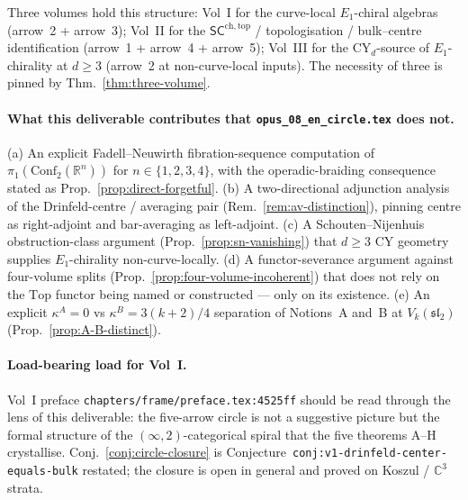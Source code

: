 \documentclass[11pt]{article}
\theoremstyle{definition}
\theoremstyle{remark}
\newcommand{\bC}{\mathbb{C}}
\newcommand{\bR}{\mathbb{R}}
\newcommand{\fsl}{\mathfrak{sl}}
\newcommand{\Conf}{\mathrm{Conf}}
\newcommand{\SCchtop}{\mathsf{SC}^{\mathrm{ch,top}}}
\newcommand{\Eone}{E_1}
\begin{document}
Three volumes hold this structure: Vol~I for the curve-local
$\Eone$-chiral algebras (arrow~2 + arrow~3); Vol~II for the
$\SCchtop$ / topologisation / bulk--centre identification (arrow~1
+ arrow~4 + arrow~5); Vol~III for the CY$_d$-source of
$\Eone$-chirality at $d \geq 3$ (arrow~2 at non-curve-local
inputs). The necessity of three is pinned by
Thm.~\ref{thm:three-volume}.

\paragraph{What this deliverable contributes that
\texttt{opus\_08\_en\_circle.tex} does not.}
(a) An explicit Fadell--Neuwirth fibration-sequence computation of
$\pi_1(\Conf_2(\bR^n))$ for $n \in \{1,2,3,4\}$, with the
operadic-braiding consequence stated as
Prop.~\ref{prop:direct-forgetful}.
(b) A two-directional adjunction analysis of the Drinfeld-centre
/ averaging pair (Rem.~\ref{rem:av-distinction}), pinning
centre as right-adjoint and bar-averaging as left-adjoint.
(c) A Schouten--Nijenhuis obstruction-class argument
(Prop.~\ref{prop:sn-vanishing}) that $d \geq 3$ CY geometry
supplies $\Eone$-chirality non-curve-locally.
(d) A functor-severance argument against four-volume splits
(Prop.~\ref{prop:four-volume-incoherent}) that does not rely on
the $\mathrm{Top}$ functor being named or constructed --- only
on its existence.
(e) An explicit $\kappa^A = 0$ vs $\kappa^B = 3(k+2)/4$
separation of Notions~A and~B at $V_k(\fsl_2)$
(Prop.~\ref{prop:A-B-distinct}).

\paragraph{Load-bearing load for Vol~I.}
Vol~I preface \texttt{chapters/frame/preface.tex:4525ff} should be
read through the lens of this deliverable: the five-arrow circle is
not a suggestive picture but the formal structure of the
$(\infty,2)$-categorical spiral that the five theorems A--H crystallise.
Conj.~\ref{conj:circle-closure} is Conjecture~\texttt{conj:v1-drinfeld-center-equals-bulk}
restated; the closure is open in general and proved on Koszul /
$\bC^3$ strata.
\end{document}
